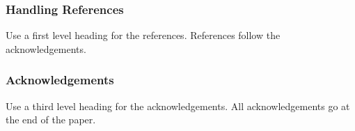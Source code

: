 \documentclass[a4paper]{article}
\begin{document}
\subsubsection{Handling References}

Use a first level heading for the references. References follow the
acknowledgements.


\subsubsection{Acknowledgements}

Use a third level heading for the acknowledgements. All acknowledgements
go at the end of the paper.


% 
 

\end{document}
